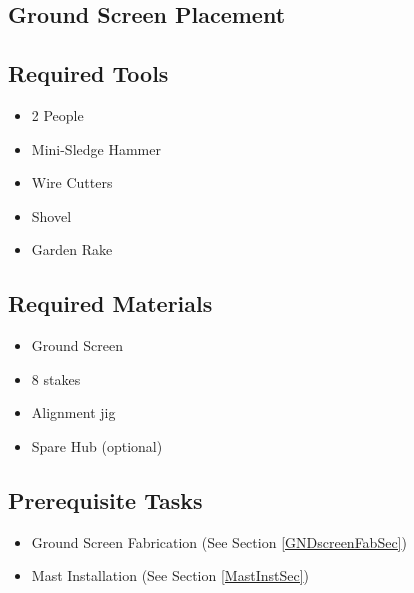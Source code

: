 \documentclass[12pt]{article}
\begin{document}
\begin{enumerate}
\section{Ground Screen Placement} \label{GNDScreenPlaceSec}
	\subsection{Required Tools}
		\begin{itemize}
			\item 2 People
			\item Mini-Sledge Hammer
			\item Wire Cutters
			\item Shovel
			\item Garden Rake
		\end{itemize}
	\subsection{Required Materials}
		\begin{itemize}
			\item Ground Screen
			\item 8 stakes
			\item Alignment jig
			\item Spare Hub (optional)
		\end{itemize}
	\subsection{Prerequisite Tasks}
		\begin{itemize}
			\item Ground Screen Fabrication (See Section \ref{GNDscreenFabSec})
			\item Mast Installation (See Section \ref{MastInstSec})
		\end{itemize}

\end{enumerate}
\end{document}
